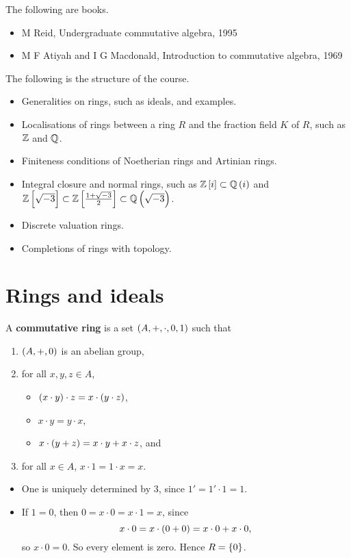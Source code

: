 The following are books.
\begin{itemize}
\item M Reid, Undergraduate commutative algebra, 1995
\item M F Atiyah and I G Macdonald, Introduction to commutative algebra, 1969
\end{itemize}

The following is the structure of the course.
\begin{itemize}
\item Generalities on rings, such as ideals, and examples.
\item Localisations of rings between a ring $ R $ and the fraction field $ K $ of $ R $, such as $ \mathbb{Z} $ and $ \mathbb{Q} $.
\item Finiteness conditions of Noetherian rings and Artinian rings.
\item Integral closure and normal rings, such as $ \ZZ\sbr{i} \subset \QQ\br{i} $ and $ \ZZ\sbr{\sqrt{-3}} \subset \ZZ\sbr{\tfrac{1 + \sqrt{-3}}{2}} \subset \QQ\br{\sqrt{-3}} $.
\item Discrete valuation rings.
\item Completions of rings with topology.
\end{itemize}

\pagebreak

\section{Rings and ideals}

\begin{definition}
A \textbf{commutative ring} is a set $ \br{A, +, \cdot, 0, 1} $ such that
\begin{enumerate}
\item $ \br{A, +, 0} $ is an abelian group,
\item for all $ x, y, z \in A $,
\begin{itemize}
\item $ \br{x \cdot y} \cdot z = x \cdot \br{y \cdot z} $,
\item $ x \cdot y = y \cdot x $,
\item $ x \cdot \br{y + z} = x \cdot y + x \cdot z $, and
\end{itemize}
\item for all $ x \in A $, $ x \cdot 1 = 1 \cdot x = x $.
\end{enumerate}
\end{definition}

\begin{remark}
\hfill
\begin{itemize}
\item One is uniquely determined by $ 3 $, since $ 1' = 1' \cdot 1 = 1 $.
\item If $ 1 = 0 $, then $ 0 = x \cdot 0 = x \cdot 1 = x $, since
$$ x \cdot 0 = x \cdot \br{0 + 0} = x \cdot 0 + x \cdot 0, $$
so $ x \cdot 0 = 0 $. So every element is zero. Hence $ R = \cbr{0} $.
\end{itemize}
\end{remark}

